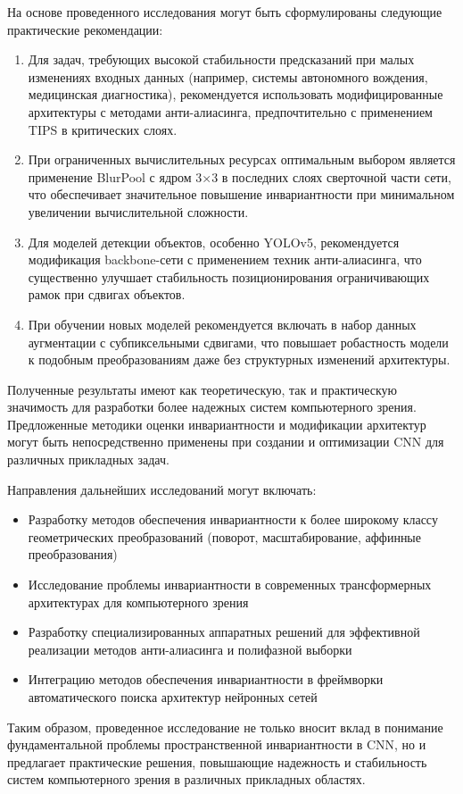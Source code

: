 На основе проведенного исследования могут быть сформулированы следующие практические рекомендации:

\begin{enumerate}
    \item Для задач, требующих высокой стабильности предсказаний при малых изменениях входных данных (например, системы автономного вождения, медицинская диагностика), рекомендуется использовать модифицированные архитектуры с методами анти-алиасинга, предпочтительно с применением TIPS в критических слоях.
    
    \item При ограниченных вычислительных ресурсах оптимальным выбором является применение BlurPool с ядром 3×3 в последних слоях сверточной части сети, что обеспечивает значительное повышение инвариантности при минимальном увеличении вычислительной сложности.
    
    \item Для моделей детекции объектов, особенно YOLOv5, рекомендуется модификация backbone-сети с применением техник анти-алиасинга, что существенно улучшает стабильность позиционирования ограничивающих рамок при сдвигах объектов.
    
    \item При обучении новых моделей рекомендуется включать в набор данных аугментации с субпиксельными сдвигами, что повышает робастность модели к подобным преобразованиям даже без структурных изменений архитектуры.
\end{enumerate}

Полученные результаты имеют как теоретическую, так и практическую значимость для разработки более надежных систем компьютерного зрения. Предложенные методики оценки инвариантности и модификации архитектур могут быть непосредственно применены при создании и оптимизации CNN для различных прикладных задач.

Направления дальнейших исследований могут включать:
\begin{itemize}
    \item Разработку методов обеспечения инвариантности к более широкому классу геометрических преобразований (поворот, масштабирование, аффинные преобразования)
    \item Исследование проблемы инвариантности в современных трансформерных архитектурах для компьютерного зрения
    \item Разработку специализированных аппаратных решений для эффективной реализации методов анти-алиасинга и полифазной выборки
    \item Интеграцию методов обеспечения инвариантности в фреймворки автоматического поиска архитектур нейронных сетей
\end{itemize}

Таким образом, проведенное исследование не только вносит вклад в понимание фундаментальной проблемы пространственной инвариантности в CNN, но и предлагает практические решения, повышающие надежность и стабильность систем компьютерного зрения в различных прикладных областях.